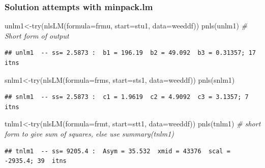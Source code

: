 \documentclass[
]{article}
\newenvironment{Shaded}{\begin{snugshade}}{\end{snugshade}}
\newcommand{\AttributeTok}[1]{\textcolor[rgb]{0.77,0.63,0.00}{#1}}
\newcommand{\CommentTok}[1]{\textcolor[rgb]{0.56,0.35,0.01}{\textit{#1}}}
\newcommand{\FunctionTok}[1]{\textcolor[rgb]{0.00,0.00,0.00}{#1}}
\newcommand{\NormalTok}[1]{#1}
\newcommand{\OtherTok}[1]{\textcolor[rgb]{0.56,0.35,0.01}{#1}}
\begin{document}
\hypertarget{solution-attempts-with-minpack.lm}{%
\subsubsection{Solution attempts with
minpack.lm}\label{solution-attempts-with-minpack.lm}}

\begin{Shaded}
\begin{Highlighting}[]
\NormalTok{unlm1}\OtherTok{\textless{}{-}}\FunctionTok{try}\NormalTok{(}\FunctionTok{nlsLM}\NormalTok{(}\AttributeTok{formula=}\NormalTok{frmu, }\AttributeTok{start=}\NormalTok{stu1, }\AttributeTok{data=}\NormalTok{weeddf))}
\FunctionTok{pnls}\NormalTok{(unlm1)  }\CommentTok{\# Short form of output}
\end{Highlighting}
\end{Shaded}

\begin{verbatim}
## unlm1  -- ss= 2.5873 :  b1 = 196.19  b2 = 49.092  b3 = 0.31357; 17  itns
\end{verbatim}

\begin{Shaded}
\begin{Highlighting}[]
\NormalTok{snlm1}\OtherTok{\textless{}{-}}\FunctionTok{try}\NormalTok{(}\FunctionTok{nlsLM}\NormalTok{(}\AttributeTok{formula=}\NormalTok{frms, }\AttributeTok{start=}\NormalTok{sts1, }\AttributeTok{data=}\NormalTok{weeddf))}
\FunctionTok{pnls}\NormalTok{(snlm1)}
\end{Highlighting}
\end{Shaded}

\begin{verbatim}
## snlm1  -- ss= 2.5873 :  c1 = 1.9619  c2 = 4.9092  c3 = 3.1357; 7  itns
\end{verbatim}

\begin{Shaded}
\begin{Highlighting}[]
\NormalTok{tnlm1}\OtherTok{\textless{}{-}}\FunctionTok{try}\NormalTok{(}\FunctionTok{nlsLM}\NormalTok{(}\AttributeTok{formula=}\NormalTok{frmt, }\AttributeTok{start=}\NormalTok{stt1, }\AttributeTok{data=}\NormalTok{weeddf))}
\FunctionTok{pnls}\NormalTok{(tnlm1) }\CommentTok{\# short form to give sum of squares, else use summary(tnlm1)}
\end{Highlighting}
\end{Shaded}

\begin{verbatim}
## tnlm1  -- ss= 9205.4 :  Asym = 35.532  xmid = 43376  scal = -2935.4; 39  itns
\end{verbatim}
\end{document}
